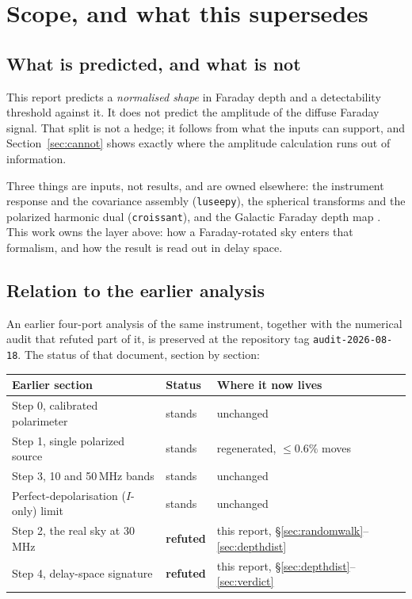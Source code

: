 \documentclass[11pt]{article}
\newcommand{\code}[1]{\texttt{#1}}
\begin{document}
\section{Scope, and what this supersedes}
\label{sec:scope}

\subsection{What is predicted, and what is not}

This report predicts a \emph{normalised shape} in Faraday depth and a
detectability threshold against it. It does not predict the amplitude of
the diffuse Faraday signal. That split is not a hedge; it follows from
what the inputs can support, and Section~\ref{sec:cannot} shows exactly
where the amplitude calculation runs out of information.

Three things are inputs, not results, and are owned elsewhere:
the instrument response and the covariance assembly (\code{luseepy}),
the spherical transforms and the polarized harmonic dual
(\code{croissant}), and the Galactic Faraday depth map
\citep{hutschenreuter2022}. This work owns the layer above: how a
Faraday-rotated sky enters that formalism, and how the result is read out
in delay space.

\subsection{Relation to the earlier analysis}
\label{sec:supersede}

An earlier four-port analysis of the same instrument, together with the
numerical audit that refuted part of it, is preserved at the repository
tag \code{audit-2026-08-18}. The status of that document, section by
section:

\begin{center}
\begin{tabular}{lll}
\toprule
Earlier section & Status & Where it now lives \\
\midrule
Step 0, calibrated polarimeter & stands & unchanged \\
Step 1, single polarized source & stands & regenerated, $\le0.6\%$ moves \\
Step 3, 10 and 50\,MHz bands & stands & unchanged \\
Perfect-depolarisation ($I$-only) limit & stands & unchanged \\
\midrule
Step 2, the real sky at 30\,MHz & \textbf{refuted} & this report, \S\ref{sec:randomwalk}--\ref{sec:depthdist} \\
Step 4, delay-space signature & \textbf{refuted} & this report, \S\ref{sec:depthdist}--\ref{sec:verdict} \\
\bottomrule
\end{tabular}
\end{center}
\end{document}

